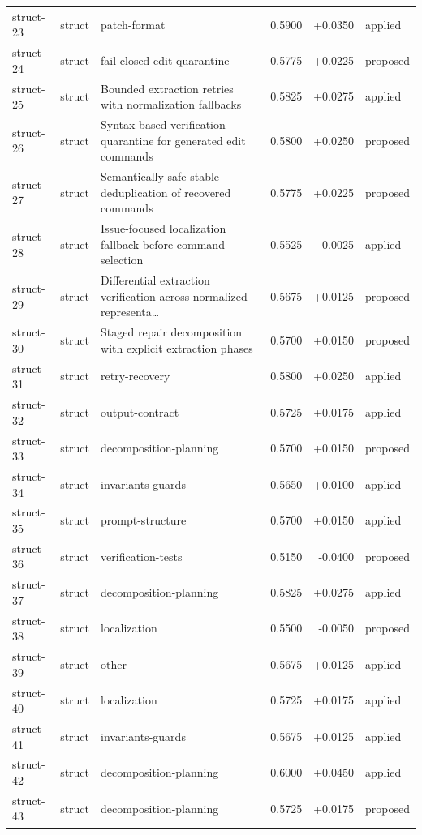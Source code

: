 \begin{center}
\begin{longtable}{llp{5.2cm}rrl}
struct-23 & struct & patch-format & 0.5900 & +0.0350 & applied \\
struct-24 & struct & fail-closed edit quarantine & 0.5775 & +0.0225 & proposed \\
struct-25 & struct & Bounded extraction retries with normalization fallbacks & 0.5825 & +0.0275 & applied \\
struct-26 & struct & Syntax-based verification quarantine for generated edit commands & 0.5800 & +0.0250 & proposed \\
struct-27 & struct & Semantically safe stable deduplication of recovered commands & 0.5775 & +0.0225 & proposed \\
struct-28 & struct & Issue-focused localization fallback before command selection & 0.5525 & -0.0025 & applied \\
struct-29 & struct & Differential extraction verification across normalized representa\ldots{} & 0.5675 & +0.0125 & proposed \\
struct-30 & struct & Staged repair decomposition with explicit extraction phases & 0.5700 & +0.0150 & proposed \\
struct-31 & struct & retry-recovery & 0.5800 & +0.0250 & applied \\
struct-32 & struct & output-contract & 0.5725 & +0.0175 & applied \\
struct-33 & struct & decomposition-planning & 0.5700 & +0.0150 & proposed \\
struct-34 & struct & invariants-guards & 0.5650 & +0.0100 & applied \\
struct-35 & struct & prompt-structure & 0.5700 & +0.0150 & applied \\
struct-36 & struct & verification-tests & 0.5150 & -0.0400 & proposed \\
struct-37 & struct & decomposition-planning & 0.5825 & +0.0275 & applied \\
struct-38 & struct & localization & 0.5500 & -0.0050 & proposed \\
struct-39 & struct & other & 0.5675 & +0.0125 & applied \\
struct-40 & struct & localization & 0.5725 & +0.0175 & applied \\
struct-41 & struct & invariants-guards & 0.5675 & +0.0125 & applied \\
struct-42 & struct & decomposition-planning & 0.6000 & +0.0450 & applied \\
struct-43 & struct & decomposition-planning & 0.5725 & +0.0175 & proposed \\

\end{longtable}
\end{center}
